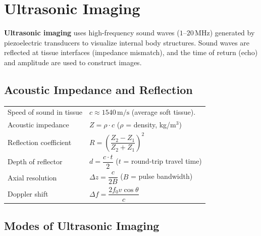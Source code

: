 \documentclass[12pt,a4paper]{article}
\renewcommand{\arraystretch}{1.45}
\begin{document}
\section{Ultrasonic Imaging}

\begin{tcolorbox}[defbox, title={\textbf{Ultrasonic Imaging}}]
\textbf{Ultrasonic imaging} uses high-frequency sound waves ($1$--$20\,\text{MHz}$) generated by piezoelectric transducers to visualize internal body structures. Sound waves are reflected at tissue interfaces (impedance mismatch), and the time of return (echo) and amplitude are used to construct images.
\end{tcolorbox}

\subsection{Acoustic Impedance and Reflection}

\begin{tcolorbox}[formulabox, title={\textbf{Ultrasound Key Formulas}}]
\renewcommand{\arraystretch}{1.3}
\begin{tabularx}{\linewidth}{B{3.8cm} X}
Speed of sound in tissue & $c \approx 1540\,\text{m/s}$ (average soft tissue). \\[4pt]
Acoustic impedance & $Z = \rho \cdot c$ \quad ($\rho$ = density, kg/m$^3$) \\[4pt]
Reflection coefficient & $R = \left(\dfrac{Z_2 - Z_1}{Z_2 + Z_1}\right)^2$ \\[8pt]
Depth of reflector & $d = \dfrac{c \cdot t}{2}$ \quad ($t$ = round-trip travel time) \\[4pt]
Axial resolution & $\Delta z = \dfrac{c}{2B}$ \quad ($B$ = pulse bandwidth) \\[4pt]
Doppler shift & $\Delta f = \dfrac{2 f_0 v \cos\theta}{c}$
\end{tabularx}
\end{tcolorbox}

\subsection{Modes of Ultrasonic Imaging}
\end{document}
